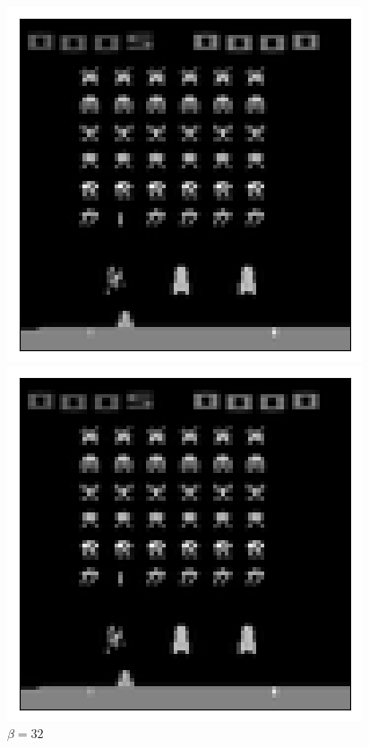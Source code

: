 \begin{figure}[h!]
\begin{multicols}{4}
    \caption{$\beta = 1$}    
    \includegraphics[scale=0.4]{figures/results/naive_average/beta_2_sample_0_reconstructed.png}
    \caption{$\beta = 2$}
    \includegraphics[scale=0.4]{figures/results/naive_average/beta_32_sample_0_reconstructed.png}
    \caption{$\beta = 32$}
\end{multicols}
\begin{multicols}{4}

\end{multicols}
\end{figure}
